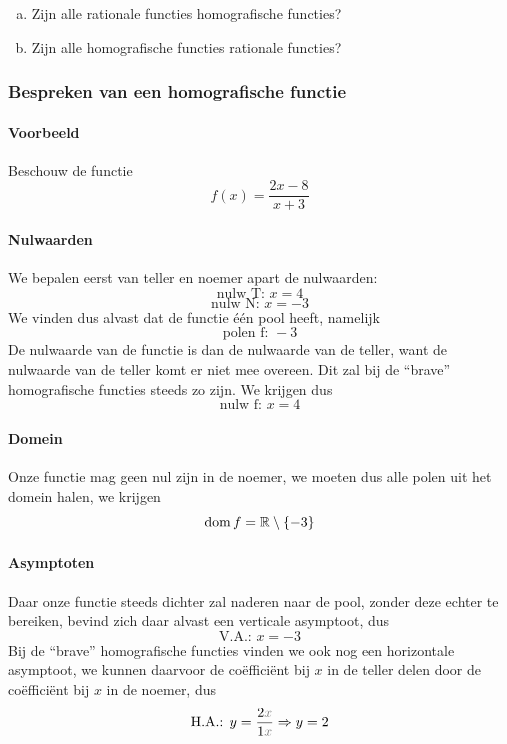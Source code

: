 \documentclass[12pt,twoside,a4paper]{article}
\begin{document}
\begin{oefening}
\begin{enumerate}[(a)]
  \item Zijn alle rationale functies homografische functies?
  \item Zijn alle homografische functies rationale functies?
\end{enumerate}
\end{oefening}

\subsubsection{Bespreken van een homografische functie}

\paragraph{Voorbeeld} Beschouw de functie
$$f(x)=\dfrac{2x-8}{x+3}$$

\paragraph{Nulwaarden} We bepalen eerst van teller en noemer apart de
nulwaarden:
$$\text{nulw T: } x=4$$
$$\text{nulw N: } x=-3$$
We vinden dus alvast dat de functie één pool heeft, namelijk
$$\text{polen f: } -3$$
De nulwaarde van de functie is dan de nulwaarde van de teller, want de
nulwaarde van de teller komt er niet mee overeen. Dit zal bij de
``brave'' homografische functies steeds zo zijn. We krijgen dus
$$\text{nulw f: } x=4$$

\paragraph{Domein} Onze functie mag geen nul zijn in de noemer, we
moeten dus alle polen uit het domein halen, we krijgen
$$\dom f = \mathbb{R} \setminus \{-3\}$$

\paragraph{Asymptoten} Daar onze functie steeds dichter zal naderen
naar de pool, zonder deze echter te bereiken, bevind zich daar alvast
een verticale asymptoot, dus
$$\text{V.A.: } x=-3$$
Bij de ``brave'' homografische functies vinden we ook nog een
horizontale asymptoot, we kunnen daarvoor de coëfficiënt bij $x$ in de
teller delen door de coëfficiënt bij $x$ in de noemer, dus
$$\text{H.A.: } y=\dfrac{2\color{gray}x}{1\color{gray}x} \Rightarrow y=2$$
\end{document}
